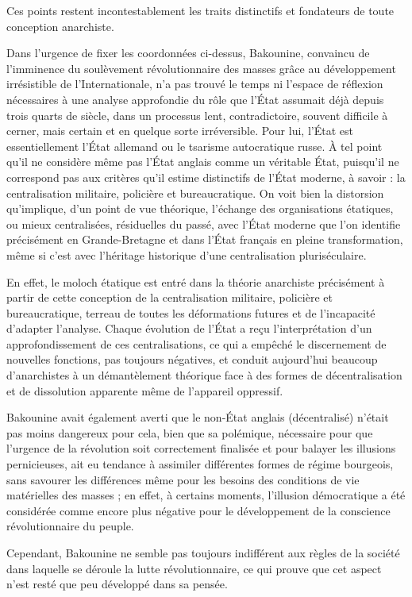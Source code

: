 Ces points restent incontestablement les traits distinctifs et fondateurs de toute conception anarchiste.

Dans l'urgence de fixer les coordonnées ci-dessus, Bakounine, convaincu de l'imminence du soulèvement révolutionnaire des masses grâce au développement irrésistible de l'Internationale, n'a pas trouvé le temps ni l'espace de réflexion nécessaires à une analyse approfondie du rôle que l'État assumait déjà depuis trois quarts de siècle, dans un processus lent, contradictoire, souvent difficile à cerner, mais certain et en quelque sorte irréversible. Pour lui, l'État est essentiellement l'État allemand ou le tsarisme autocratique russe. À tel point qu'il ne considère même pas l'État anglais comme un véritable État, puisqu'il ne correspond pas aux critères qu'il estime distinctifs de l'État moderne, à savoir : la centralisation militaire, policière et bureaucratique. On voit bien la distorsion qu'implique, d'un point de vue théorique, l'échange des organisations étatiques, ou mieux centralisées, résiduelles du passé, avec l'État moderne que l'on identifie précisément en Grande-Bretagne et dans l'État français en pleine transformation, même si c'est avec l'héritage historique d'une centralisation pluriséculaire.

En effet, le moloch étatique est entré dans la théorie anarchiste précisément à partir de cette conception de la centralisation militaire, policière et bureaucratique, terreau de toutes les déformations futures et de l'incapacité d'adapter l'analyse. Chaque évolution de l'État a reçu l'interprétation d'un approfondissement de ces centralisations, ce qui a empêché le discernement de nouvelles fonctions, pas toujours négatives, et conduit aujourd'hui beaucoup d'anarchistes à un démantèlement théorique face à des formes de décentralisation et de dissolution apparente même de l'appareil oppressif.

Bakounine avait également averti que le non-État anglais (décentralisé) n'était pas moins dangereux pour cela, bien que sa polémique, nécessaire pour que l'urgence de la révolution soit correctement finalisée et pour balayer les illusions pernicieuses, ait eu tendance à assimiler différentes formes de régime bourgeois, sans savourer les différences même pour les besoins des conditions de vie matérielles des masses ; en effet, à certains moments, l'illusion démocratique a été considérée comme encore plus négative pour le développement de la conscience révolutionnaire du peuple.

Cependant, Bakounine ne semble pas toujours indifférent aux règles de la société dans laquelle se déroule la lutte révolutionnaire, ce qui prouve que cet aspect n'est resté que peu développé dans sa pensée.

